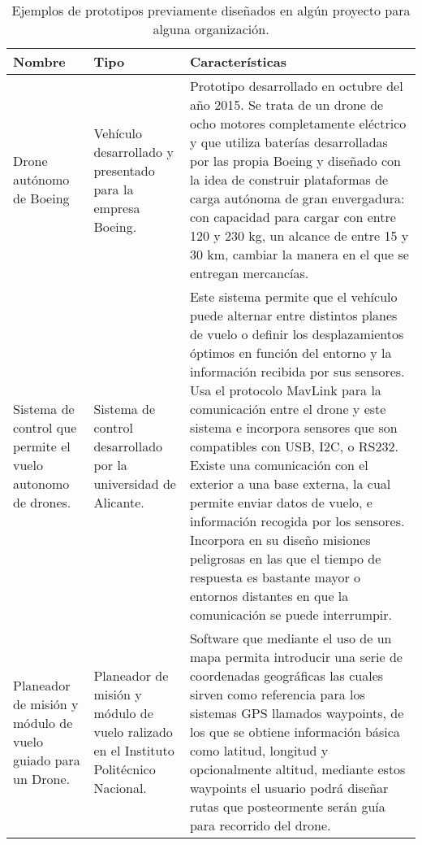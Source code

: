 \begin{longtable}[c]{| p{4cm} | p{4cm} | p{6.5cm} |}
	\caption{Ejemplos de prototipos previamente diseñados en algún proyecto 
		para alguna organización. \label{tab:edo:arte:proyectos}} 
	\\\hline
	\textbf{Nombre} & \textbf{Tipo} & \textbf{Características}
	\\\hline \hline
	\endfirsthead

	\hline
	\endhead

	\hline
	\endfoot

	\hline
	\endlastfoot

	Drone autónomo de Boeing &
	Vehículo desarrollado y presentado para la 
	empresa Boeing. & 
	Prototipo desarrollado en octubre del año 
	2015. Se trata de un drone de ocho motores completamente 
	eléctrico y que utiliza baterías desarrolladas por las propia 
	Boeing y diseñado con la idea de construir plataformas de carga 
	autónoma de gran envergadura: con capacidad para cargar con 
	entre 120 y 230 kg, un alcance de entre 15 y 30 km, cambiar la 
	manera en el que se entregan mercancías.
	\\\hline
	Sistema de control que permite el vuelo autonomo 
	de drones. &
	Sistema de  control desarrollado por la 
	universidad de Alicante. &
	Este sistema permite que el vehículo puede 
	alternar entre distintos planes de vuelo o definir los 
	desplazamientos óptimos en función del entorno y la información 
	recibida por sus sensores. 
	Usa el protocolo MavLink para la comunicación entre el drone 
	y este sistema e incorpora sensores que son compatibles con USB, 
	I2C, o RS232. 
	Existe una comunicación con el exterior a una base externa, la 
	cual permite enviar datos de vuelo, e información recogida por 
	los sensores.
	Incorpora en su diseño misiones peligrosas en las que el 
	tiempo de respuesta es bastante mayor o entornos distantes en 
	que la comunicación se puede interrumpir.
	\\\hline
	Planeador de misión y módulo de vuelo guiado 
	para un Drone. &
	Planeador de misión y módulo de vuelo ralizado 
	en el Instituto Politécnico Nacional. &
	Software que mediante el uso de un mapa 
	permita introducir una serie de coordenadas geográficas las 
	cuales sirven como referencia para los sistemas GPS llamados 
	waypoints, de los que se obtiene información básica como 
	latitud, longitud y opcionalmente altitud, mediante estos 
	waypoints el usuario podrá diseñar rutas que posteormente serán 
	guía para recorrido del drone.
	\\\hline

\end{longtable}
